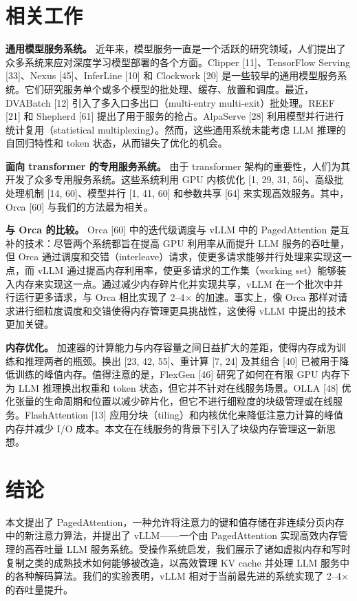 \documentclass[11pt,UTF8,fontset=fandol]{ctexart}
\begin{document}
\section{相关工作}

\textbf{通用模型服务系统。} 近年来，模型服务一直是一个活跃的研究领域，人们提出了众多系统来应对深度学习模型部署的各个方面。Clipper [11]、TensorFlow Serving [33]、Nexus [45]、InferLine [10] 和 Clockwork [20] 是一些较早的通用模型服务系统。它们研究服务单个或多个模型的批处理、缓存、放置和调度。最近，DVABatch [12] 引入了多入口多出口（multi-entry multi-exit）批处理。REEF [21] 和 Shepherd [61] 提出了用于服务的抢占。AlpaServe [28] 利用模型并行进行统计复用（statistical multiplexing）。然而，这些通用系统未能考虑 LLM 推理的自回归特性和 token 状态，从而错失了优化的机会。

\textbf{面向 transformer 的专用服务系统。} 由于 transformer 架构的重要性，人们为其开发了众多专用服务系统。这些系统利用 GPU 内核优化 [1, 29, 31, 56]、高级批处理机制 [14, 60]、模型并行 [1, 41, 60] 和参数共享 [64] 来实现高效服务。其中，Orca [60] 与我们的方法最为相关。

\textbf{与 Orca 的比较。} Orca [60] 中的迭代级调度与 vLLM 中的 PagedAttention 是互补的技术：尽管两个系统都旨在提高 GPU 利用率从而提升 LLM 服务的吞吐量，但 Orca 通过调度和交错（interleave）请求，使更多请求能够并行处理来实现这一点，而 vLLM 通过提高内存利用率，使更多请求的工作集（working set）能够装入内存来实现这一点。通过减少内存碎片化并实现共享，vLLM 在一个批次中并行运行更多请求，与 Orca 相比实现了 2--4$\times$ 的加速。事实上，像 Orca 那样对请求进行细粒度调度和交错使得内存管理更具挑战性，这使得 vLLM 中提出的技术更加关键。

\textbf{内存优化。} 加速器的计算能力与内存容量之间日益扩大的差距，使得内存成为训练和推理两者的瓶颈。换出 [23, 42, 55]、重计算 [7, 24] 及其组合 [40] 已被用于降低训练的峰值内存。值得注意的是，FlexGen [46] 研究了如何在有限 GPU 内存下为 LLM 推理换出权重和 token 状态，但它并不针对在线服务场景。OLLA [48] 优化张量的生命周期和位置以减少碎片化，但它不进行细粒度的块级管理或在线服务。FlashAttention [13] 应用分块（tiling）和内核优化来降低注意力计算的峰值内存并减少 I/O 成本。本文在在线服务的背景下引入了块级内存管理这一新思想。

\section{结论}

本文提出了 PagedAttention，一种允许将注意力的键和值存储在非连续分页内存中的新注意力算法，并提出了 vLLM——一个由 PagedAttention 实现高效内存管理的高吞吐量 LLM 服务系统。受操作系统启发，我们展示了诸如虚拟内存和写时复制之类的成熟技术如何能够被改造，以高效管理 KV cache 并处理 LLM 服务中的各种解码算法。我们的实验表明，vLLM 相对于当前最先进的系统实现了 2--4$\times$ 的吞吐量提升。
\end{document}
